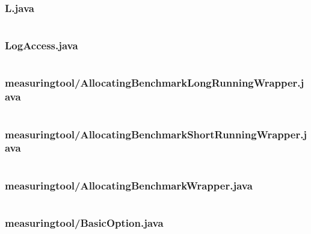 \documentclass[a4paper,12pt]{article}
\begin{document}
\subsubsection{L.java}
\inputminted[fontsize=\small, linenos, numbersep=5pt, tabsize=4, frame=topline,framesep=0.8cm]{java}{/home/tituomin/StudioProjects/nativebenchmark/src/fi/helsinki/cs/tituomin/nativebenchmark/L.java}
\vspace{1cm}
\subsubsection{LogAccess.java}
\inputminted[fontsize=\small, linenos, numbersep=5pt, tabsize=4, frame=topline,framesep=0.8cm]{java}{/home/tituomin/StudioProjects/nativebenchmark/src/fi/helsinki/cs/tituomin/nativebenchmark/LogAccess.java}
\vspace{1cm}
\subsubsection{measuringtool/AllocatingBenchmarkLongRunningWrapper.java}
\inputminted[fontsize=\small, linenos, numbersep=5pt, tabsize=4, frame=topline,framesep=0.8cm]{java}{/home/tituomin/StudioProjects/nativebenchmark/src/fi/helsinki/cs/tituomin/nativebenchmark/measuringtool/AllocatingBenchmarkLongRunningWrapper.java}
\vspace{1cm}
\subsubsection{measuringtool/AllocatingBenchmarkShortRunningWrapper.java}
\inputminted[fontsize=\small, linenos, numbersep=5pt, tabsize=4, frame=topline,framesep=0.8cm]{java}{/home/tituomin/StudioProjects/nativebenchmark/src/fi/helsinki/cs/tituomin/nativebenchmark/measuringtool/AllocatingBenchmarkShortRunningWrapper.java}
\vspace{1cm}
\subsubsection{measuringtool/AllocatingBenchmarkWrapper.java}
\inputminted[fontsize=\small, linenos, numbersep=5pt, tabsize=4, frame=topline,framesep=0.8cm]{java}{/home/tituomin/StudioProjects/nativebenchmark/src/fi/helsinki/cs/tituomin/nativebenchmark/measuringtool/AllocatingBenchmarkWrapper.java}
\vspace{1cm}
\subsubsection{measuringtool/BasicOption.java}
\inputminted[fontsize=\small, linenos, numbersep=5pt, tabsize=4, frame=topline,framesep=0.8cm]{java}{/home/tituomin/StudioProjects/nativebenchmark/src/fi/helsinki/cs/tituomin/nativebenchmark/measuringtool/BasicOption.java}
\vspace{1cm}
\end{document}
